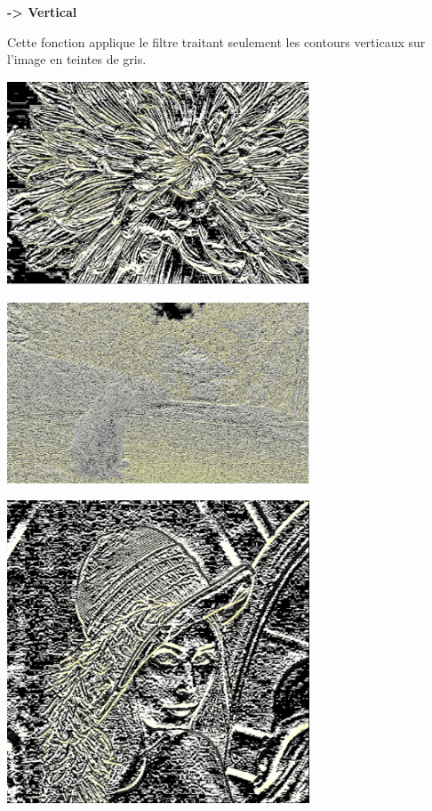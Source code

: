 \documentclass{article}
\begin{document}
\textbf{-> Vertical}

Cette fonction applique le filtre traitant seulement les contours verticaux sur l'image en teintes de gris.

\begin{center} 
    \includegraphics[width=9cm]{../Image_fonctions/Multicolor/PrewittV.PNG}
\end{center}
\begin{center} 
    \includegraphics[width=9cm]{../Image_fonctions/Cat/PrewittV.PNG}
\end{center}
\begin{center} 
    \includegraphics[width=9cm]{../Image_fonctions/Lenna/PrewittV.PNG}
\end{center}
\end{document}
